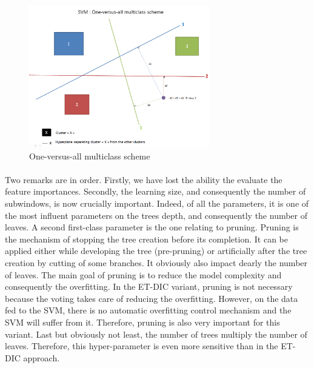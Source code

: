 \documentclass[a4paper]{report}
\begin{document}
		\begin{figure}
			\centering
				\includegraphics[width=0.7\textwidth]{images/SVMOneVersusAll.png}
			\caption{\label{fig:SVMOneVersusAll}One-versus-all multiclass scheme}
		\end{figure}
		\paragraph{}
		Two remarks are in order. Firstly, we have lost the ability the evaluate the feature importances. Secondly, the learning size, and consequently the number of subwindows, is now crucially important. Indeed, of all the parameters, it is one of the most influent parameters on the trees depth, and consequently the number of leaves. 
		A second first-class parameter is the one relating to pruning. Pruning is the mechanism of stopping the tree creation before its completion. It can be applied either while developing the tree (pre-pruning) or artificially after the tree creation by cutting of some branches. It obviously also impact dearly the number of leaves. The main goal of pruning is to reduce the model complexity and consequently the overfitting. In the ET-DIC variant, pruning is not necessary because the voting takes care of reducing the overfitting. However, on the data fed to the SVM, there is no automatic overfitting control mechanism and the SVM will suffer from it. Therefore, pruning is also very important for this variant.
		Last but obviously not least, the number of trees multiply the number of leaves. Therefore, this hyper-parameter is even more sensitive than in the ET-DIC approach.
\end{document}
